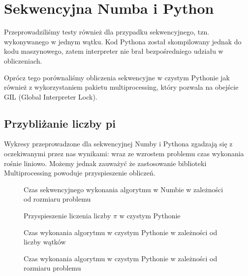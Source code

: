 \section{Sekwencyjna Numba i Python}
Przeprowadziliśmy testy również dla przypadku sekwencyjnego, tzn. wykonywanego w jednym wątku.
Kod Pythona został skompilowany jednak do kodu maszynowego, zatem interpreter nie brał bezpośredniego udziału w obliczeniach.

Oprócz tego porównaliśmy obliczenia sekwencyjne w czystym Pythonie jak również z wykorzystaniem pakietu multiprocessing,
który pozwala na obejście GIL (Global Interpreter Lock).

\subsection{Przybliżanie liczby pi}
Wykresy przeprowadzone dla sekwencyjnej Numby i Pythona zgadzają się z oczekiwanymi przez nas wynikami: wraz ze wzrostem problemu czas wykonania rośnie liniowo.
Możemy jednak zauważyć że zastosowanie biblioteki Multiprocessing powoduje przyspieszenie obliczeń.

\begin{figure*}
        \centering
        
        \caption{Czas sekwencyjnego wykonania algorytmu w Numbie w zależności od rozmiaru problemu}
        \label{fig:numba-seq-sizes}
    \end{figure*}

    \begin{figure*}
        \centering
        \begin{minipage}[b]{.45\textwidth}
            \centering
            
            \caption{Przyspieszenie liczenia liczby $\pi$ w czystym Pythonie}
            \label{fig:python-speedup}
        \end{minipage}
        \hfill
        \begin{minipage}[b]{.45\textwidth}
            \centering
            
            \caption{Czas wykonania algorytmu w czystym Pythonie w zależności od liczby wątków}
            \label{fig:python-threads}
        \end{minipage}
    \end{figure*}

    \begin{figure*}
        \centering
        
        \caption{Czas wykonania algorytmu w czystym Pythonie w zależności od rozmiaru problemu}
        \label{fig:python-sizes}
    \end{figure*}

